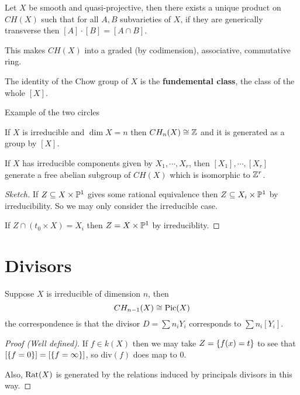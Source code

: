 \begin{theorem}
Let $X$ be smooth and quasi-projective, then there exists a unique product on $CH(X)$ such that for all $A,B$ subvarieties of $X$, if they are generically transverse then $[A]\cdot [B]=[A\cap B]$.

This makes $CH(X)$ into a graded (by codimension), associative, commutative ring.
\end{theorem}

\begin{remark}
The identity of the Chow group of $X$ is the \textbf{fundemental class}, the class of the whole $[X]$.
\end{remark}


\begin{example}
Example of the two circles
\end{example}

\begin{theorem}
If $X$ is irreducible and $\dim X=n$ then $CH_n(X)\cong \mathbb{Z}$ and it is generated as a group by $[X]$.

If $X$ has irreducible components given by $X_1,\cdots, X_r$, then $[X_1],\cdots, [X_r]$ generate a free abelian subgroup of $CH(X)$ which is isomorphic to $\mathbb{Z}^r$.
\end{theorem}
\begin{proof}[Sketch]
If $Z\subseteq X\times \mathbb{P}^1$ gives some rational equivalence then $Z\subseteq X_i\times \mathbb{P}^1$ by irreducibility. So we may only consider the irreducible case.

If $Z\cap (t_0\times X)=X_i$ then $Z=X\times \mathbb{P}^1$ by irreduciblity.
\end{proof}

\section{Divisors}
\begin{proposition}
Suppose $X$ is irreducible of dimension $n$, then
\[CH_{n-1}(X)\cong \operatorname{Pic}(X)\]
the correspondence is that the divisor $D=\sum n_i Y_i$ corresponds to $\sum n_i[Y_i]$.
\end{proposition}
\begin{proof}[Proof (Well defined)]
If $f\in k(X)$ then we may take $Z=\left\{{f(x)=t}\right\}$ to see that $[\left\{{f=0}\right\}]=[\left\{{f=\infty}\right\}]$, so $\mathrm{div}(f)$ does map to $0$.

Also, $\mathrm{Rat}(X)$ is generated by the relations induced by principals divisors in this way.
\end{proof}




